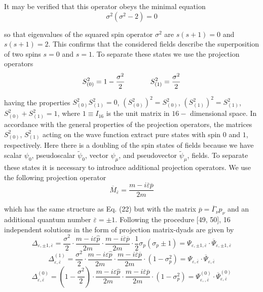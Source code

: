 \documentclass[a4paper,12pt]{article}
\begin{document}
It may be verified that this operator obeys the minimal equation
\begin{equation}
\sigma ^2\left( \sigma ^2-2\right) =0  \label{30}
\end{equation}

so that eigenvalues of the squared spin operator $\sigma ^2$ are $s(s+1)=0$
and $s(s+1)=2$. This confirms that the considered fields describe the
superposition of two spins $s=0$ and $s=1$. To separate these states we use
the projection operators
\begin{equation}
S_{(0)}^2=1-\frac{\sigma ^2}2\hspace{0.5in}S_{(1)}^2=\frac{\sigma ^2}2
\label{31}
\end{equation}

having the properties $S_{(0)}^2S_{(1)}^2=0$, $\left( S_{(0)}^2\right)
^2=S_{(0)}^2$, $\left( S_{(1)}^2\right) ^2=S_{(1)}^2$, $%
S_{(0)}^2+S_{(1)}^2=1 $, where $1\equiv I_{16}$ is the unit matrix
in $16-$ dimensional space. In accordance with the general
properties of the projection operators, the matrices $S_{(0)}^2$,
$S_{(1)}^2$ acting on the wave function extract pure states with
spin $0$ and $1$, respectively. Here there is a doubling of the
spin states of fields because we have scalar $ \psi _0$,
pseudoscalar $\widetilde{\psi }_0$, vector $\psi _\mu $, and
pseudovector $\widetilde{\psi }_\mu $, fields. To separate these
states it is necessary to introduce additional projection
operators. We use the following projection operator
\begin{equation}
\overline{M}_{\overline{\varepsilon
}}=\frac{m-i\overline{\varepsilon } \overline{p}}{2m}  \label{32}
\end{equation}

which has the same structure as Eq. (22) but with the matrix
$\overline{p}= \overline{\Gamma }_\nu p_\nu $ and an additional
quantum number $\overline{ \varepsilon }=\pm 1$. Following the
procedure [49, 50], 16 independent solutions in the form of
projection matrix-dyads are given by
\[
\Delta _{\varepsilon ,\pm 1,\overline{\varepsilon }}=\frac{\sigma
^2}2\cdot \frac{m-i\varepsilon \widehat{p}}{2m}\cdot
\frac{m-i\overline{\varepsilon } \overline{p}}{2m}\cdot \frac
12\sigma _p\left( \sigma _p\pm 1\right) =\Psi _{\varepsilon ,\pm
1,\overline{\varepsilon }}\cdot \overline{\Psi } _{\varepsilon
,\pm 1,\overline{\varepsilon }}
\]
\[
\Delta _{\varepsilon ,\overline{\varepsilon }}^{(1)}=\frac{\sigma
^2}2\cdot \frac{m-i\varepsilon \widehat{p}}{2m}\cdot
\frac{m-i\overline{\varepsilon } \overline{p}}{2m}\cdot \left(
1-\sigma _p^2\right) =\Psi _{\varepsilon , \overline{\varepsilon
}}\cdot \overline{\Psi }_{\varepsilon ,\overline{ \varepsilon }}
\]
\begin{equation}
\Delta _{\varepsilon ,\overline{\varepsilon }}^{(0)}=\left(
1-\frac{\sigma ^2 }2\right) \cdot \frac{m-i\varepsilon
\widehat{p}}{2m}\cdot \frac{m-i \overline{\varepsilon
}\overline{p}}{2m}\cdot \left( 1-\sigma _p^2\right) =\Psi
_{\varepsilon ,,\overline{\varepsilon }}^{(0)}\cdot \overline{\Psi
} _{\varepsilon ,\overline{\varepsilon }}^{(0)}  \label{33}
\end{equation}
\end{document}
